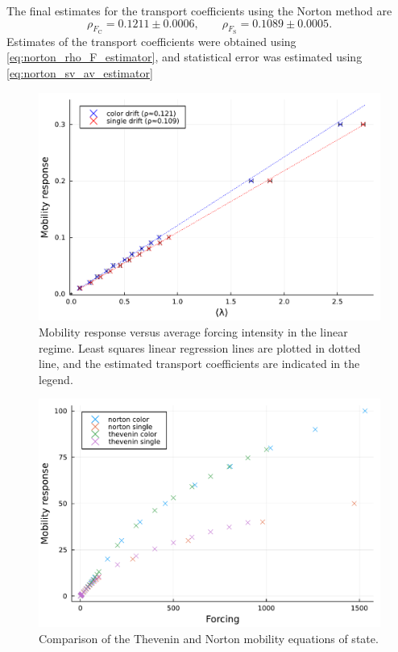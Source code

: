 The final estimates for the transport coefficients using the Norton method are 
\[\rho_{F_{\mathrm{C}}} = 0.1211 \pm 0.0006,\qquad \rho_{F_{\mathrm{S}}}=0.1089\pm0.0005.\]
Estimates of the transport coefficients were obtained using \eqref{eq:norton_rho_F_estimator}, and statistical error was estimated using \eqref{eq:norton_sv_av_estimator}

\begin{figure}[htbp]
    \begin{center}
      \includegraphics[width=0.9\linewidth]{figures/norton_mobility_plot.pdf}
      \caption{ \label{fig:norton_mobility_linear}
        Mobility response versus average forcing intensity in the linear regime. Least squares linear regression lines are plotted in dotted line, and the estimated transport coefficients are indicated in the legend.
      }
    \end{center}
  \end{figure}

  \begin{figure}[htbp]
    \begin{center}
      \includegraphics[width=0.7\linewidth]{figures/norton_mobility_full.pdf}
      \caption{ \label{fig:norton_mobility_full}
        Comparison of the Thevenin and Norton mobility equations of state.
      }
    \end{center}
  \end{figure}

